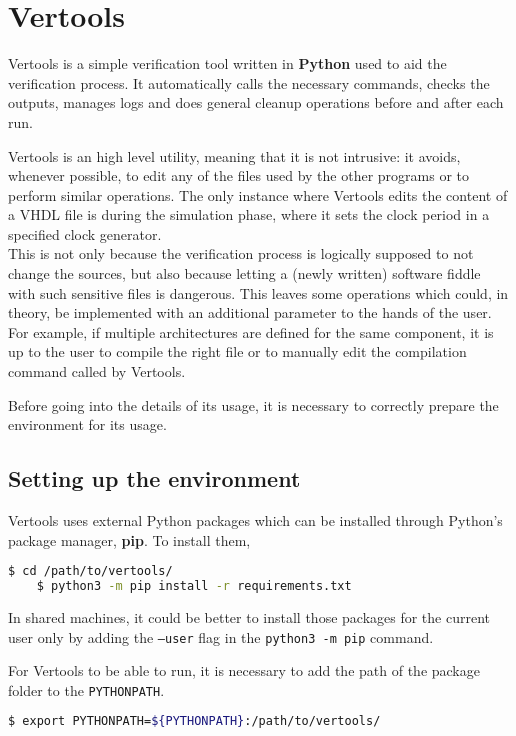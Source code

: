 \section{Vertools}
\label{sec:vertools}
Vertools is a simple verification tool written in \textbf{Python} used to aid the verification process. It automatically calls the necessary commands, checks the outputs, manages logs and does general cleanup operations before and after each run.

Vertools is an high level utility, meaning that it is not intrusive: it avoids, whenever possible, to edit any of the files used by the other programs or to perform similar operations. The only instance where Vertools edits the content of a VHDL file is during the simulation phase, where it sets the clock period in a specified clock generator. \\
This is not only because the verification process is logically supposed to not change the sources, but also because letting a (newly written) software fiddle with such sensitive files is dangerous. This leaves some operations which could, in theory, be implemented with an additional parameter to the hands of the user. For example, if multiple architectures are defined for the same component, it is up to the user to compile the right file or to manually edit the compilation command called by Vertools.

Before going into the details of its usage, it is necessary to correctly prepare the environment for its usage.

\subsection{Setting up the environment}
Vertools uses external Python packages which can be installed through Python's package manager, \textbf{pip}. To install them,
\begin{lstlisting}[language=bash]
    $ cd /path/to/vertools/
    $ python3 -m pip install -r requirements.txt
\end{lstlisting}
In shared machines, it could be better to install those packages for the current user only by adding the \texttt{--user} flag in the \texttt{python3 -m pip} command.

For Vertools to be able to run, it is necessary to add the path of the package folder to the \texttt{PYTHONPATH}.
\begin{lstlisting}[language=bash]
    $ export PYTHONPATH=${PYTHONPATH}:/path/to/vertools/
\end{lstlisting}

